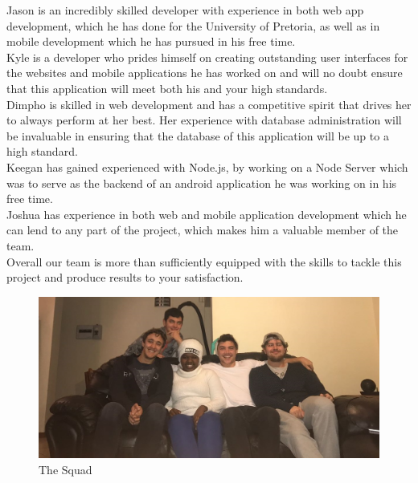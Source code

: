 \documentclass[12pt]{article}
\begin{document}
	Jason is an incredibly skilled developer with experience in both web app development, which he has done for the University of Pretoria, as well as in mobile development which he has pursued in his free time.\\
	
	Kyle is a developer who prides himself on creating outstanding user interfaces for the websites and mobile applications he has worked on and will no doubt ensure that this application will meet both his and your high standards.\\
	
	Dimpho is skilled in web development and has a competitive spirit that drives her to always perform at her best. Her experience with database administration will be invaluable in ensuring that the database of this application will be up to a high standard.\\
	
	Keegan has gained experienced with Node.js, by working on a Node Server which was to serve as the backend of an android application he was working on in his free time.\\
	
	Joshua has experience in both web and mobile application development which he can lend to any part of the project, which makes him a valuable member of the team.\\
	
	Overall our team is more than sufficiently equipped with the skills to tackle this project and produce results to your satisfaction.\\
	\begin{figure}[htb]
	\centering
	\includegraphics[width=\textwidth]{../Common/team.jpg}
	\caption{The Squad}
	\end{figure}\\
\end{document}
